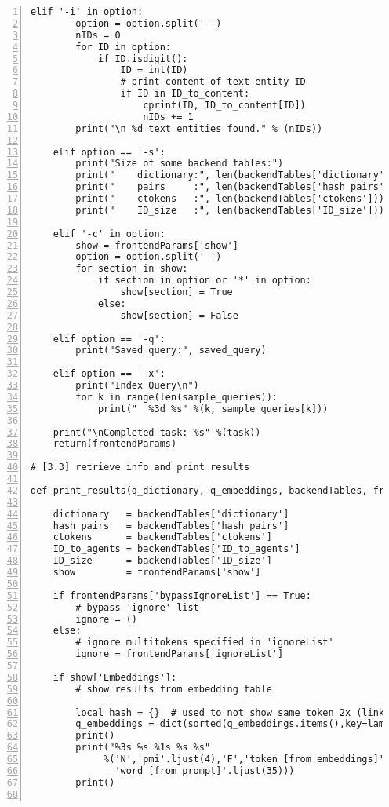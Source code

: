 \documentclass[10pt]{article}
\begin{document}
{\begin{lstlisting}[numbers=left,basicstyle=\ttfamily\footnotesize]
    elif '-i' in option:
        option = option.split(' ')
        nIDs = 0
        for ID in option:
            if ID.isdigit():
                ID = int(ID)
                # print content of text entity ID
                if ID in ID_to_content:
                    cprint(ID, ID_to_content[ID]) 
                    nIDs += 1
        print("\n %d text entities found." % (nIDs))

    elif option == '-s':
        print("Size of some backend tables:")
        print("    dictionary:", len(backendTables['dictionary'])) 
        print("    pairs     :", len(backendTables['hash_pairs'])) 
        print("    ctokens   :", len(backendTables['ctokens']))
        print("    ID_size   :", len(backendTables['ID_size']))

    elif '-c' in option: 
        show = frontendParams['show']
        option = option.split(' ')
        for section in show:
            if section in option or '*' in option:
                show[section] = True
            else:
                show[section] = False

    elif option == '-q':
        print("Saved query:", saved_query)

    elif option == '-x':
        print("Index Query\n")
        for k in range(len(sample_queries)):
            print("  %3d %s" %(k, sample_queries[k]))

    print("\nCompleted task: %s" %(task))
    return(frontendParams)

# [3.3] retrieve info and print results

def print_results(q_dictionary, q_embeddings, backendTables, frontendParams):

    dictionary   = backendTables['dictionary']
    hash_pairs   = backendTables['hash_pairs']
    ctokens      = backendTables['ctokens'] 
    ID_to_agents = backendTables['ID_to_agents']
    ID_size      = backendTables['ID_size']
    show         = frontendParams['show']

    if frontendParams['bypassIgnoreList'] == True:  
        # bypass 'ignore' list
        ignore = ()
    else:
        # ignore multitokens specified in 'ignoreList'
        ignore = frontendParams['ignoreList']  

    if show['Embeddings']:
        # show results from embedding table

        local_hash = {}  # used to not show same token 2x (linked to 2 different words)     
        q_embeddings = dict(sorted(q_embeddings.items(),key=lambda item: item[1],reverse=True))
        print()
        print("%3s %s %1s %s %s" 
             %('N','pmi'.ljust(4),'F','token [from embeddings]'.ljust(35),
               'word [from prompt]'.ljust(35)))
        print()


\end{lstlisting}}
\end{document}
